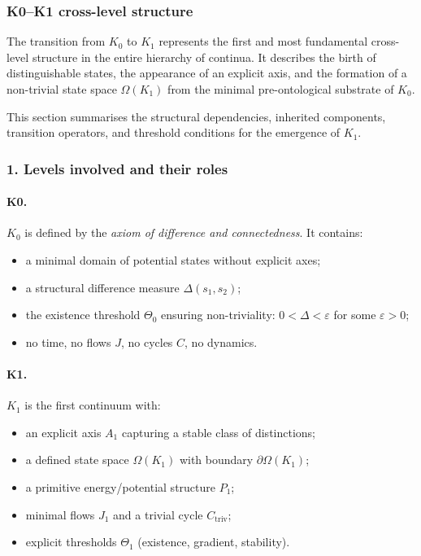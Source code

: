 
\subsubsection{K0–K1 cross-level structure}
\label{sec:crossk-k0-k1}

The transition from $K_0$ to $K_1$ represents the first and most fundamental
cross-level structure in the entire hierarchy of continua. It describes the
birth of distinguishable states, the appearance of an explicit axis, and the
formation of a non-trivial state space $\Omega(K_1)$ from the minimal
pre-ontological substrate of $K_0$.

This section summarises the structural dependencies, inherited components,
transition operators, and threshold conditions for the emergence of $K_1$.

\subsubsection{1. Levels involved and their roles}

\paragraph{K0.}
$K_0$ is defined by the \emph{axiom of difference and connectedness}.
It contains:
\begin{itemize}
  \item a minimal domain of potential states without explicit axes;
  \item a structural difference measure $\Delta(s_1,s_2)$;
  \item the existence threshold $\Theta_0$ ensuring non-triviality:
        $0 < \Delta < \varepsilon$ for some $\varepsilon>0$;
  \item no time, no flows $J$, no cycles $C$, no dynamics.
\end{itemize}

\paragraph{K1.}
$K_1$ is the first continuum with:
\begin{itemize}
  \item an explicit axis $A_1$ capturing a stable class of distinctions;
  \item a defined state space $\Omega(K_1)$ with boundary $\partial\Omega(K_1)$;
  \item a primitive energy/potential structure $P_1$;
  \item minimal flows $J_1$ and a trivial cycle $C_{\mathrm{triv}}$;
  \item explicit thresholds $\Theta_1$ (existence, gradient, stability).
\end{itemize}

